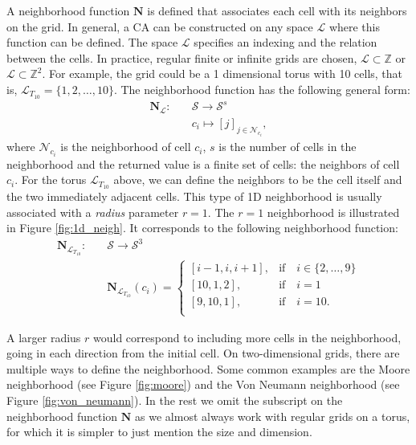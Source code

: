 A neighborhood function $\boldsymbol{N}$ is defined that associates each cell
with its neighbors on the grid. In general, a \ac{CA} can be constructed on any
space $\mathcal{L}$ where this function can be defined. The space $\mathcal{L}$ specifies an
indexing and the relation between the cells. In practice, regular finite or
infinite grids are chosen, $\mathcal{L} \subset \mathbb{Z}$ or $\mathcal{L} \subset \mathbb{Z}^{2}$. For example, the grid could
be a 1 dimensional torus with 10 cells, that is,
$\mathcal{L}_{{T_{10}}} = \{1, 2, \ldots, 10 \}$. The neighborhood function has the following
general form:
\begin{equation}
  \begin{aligned}
\boldsymbol{N}_{\mathcal{L}} :\quad & \mathcal{S} \rightarrow \mathcal{S}^{s}\\
&{c_i} \mapsto [{j}]_{j\in \mathcal{N}_{c_{i}}},
  \end{aligned}
\end{equation}
where $\mathcal{N}_{c_{i}}$ is the neighborhood of cell $c_{i}$, $s$ is the
number of cells in the neighborhood and the returned value is a finite set of
cells: the neighbors of cell $c_{i}$. For the torus $\mathcal{L}_{T_{10}}$
above, we can define the neighbors to be the cell itself and the two immediately
adjacent cells. This type of 1D neighborhood is usually associated with a
\emph{radius} parameter $r = 1$. The $r=1$ neighborhood is illustrated in Figure
\ref{fig:1d_neigh}. It corresponds to the following neighborhood function:
\begin{equation}
  \begin{aligned}
\boldsymbol{N}_{\mathcal{L}_{T_{10}}} :\quad & \mathcal{S} \rightarrow \mathcal{S}^{3} \\
&\boldsymbol{N}_{\mathcal{L}_{T_{10}}}(c_{i}) = \begin{cases}
                      [{i - 1}, {i}, {i + 1}],& \text{if}\quad i \in \{2,\ldots , 9\}\\
                       [{10}, {1}, {2}], & \text{if} \quad i = 1 \\
                       [{9}, {10}, {1}], & \text{if} \quad i = 10. \\
                    \end{cases}
  \end{aligned}
  \label{eq:torus_index}
\end{equation}

A larger radius $r$ would correspond to including more cells in the
neighborhood, going in each direction from the initial cell. On two-dimensional
grids, there are multiple ways to define the neighborhood. Some common examples
are the Moore neighborhood (see Figure \ref{fig:moore}) and the Von Neumann
neighborhood (see Figure \ref{fig:von_neumann}). In the rest we omit the
subscript on the neighborhood function $\boldsymbol{N}$ as we almost always work
with regular grids on a torus, for which it is simpler to just mention the size
and dimension.

